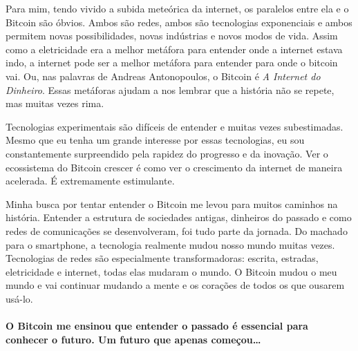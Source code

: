 Para mim, tendo vivido a subida meteórica da internet, os paralelos entre ela e o Bitcoin são óbvios. Ambos são redes, ambos são tecnologias exponenciais e ambos permitem novas possibilidades, novas indústrias e novos modos de vida. Assim como a eletricidade era a melhor metáfora para entender onde a internet estava indo, a internet pode ser a melhor metáfora para entender para onde o bitcoin vai. Ou, nas palavras de Andreas Antonopoulos, o Bitcoin é \textit{A Internet do Dinheiro}. Essas metáforas ajudam a nos lembrar que a história não se repete, mas muitas vezes rima.

Tecnologias experimentais são difíceis de entender e muitas vezes subestimadas. Mesmo que eu tenha um grande interesse por essas tecnologias, eu sou constantemente surpreendido pela rapidez do progresso e da inovação. Ver o ecossistema do Bitcoin crescer é como ver o crescimento da internet de maneira acelerada. É extremamente estimulante.

Minha busca por tentar entender o Bitcoin me levou para muitos caminhos na história. Entender a estrutura de sociedades antigas, dinheiros do passado e como redes de comunicações se desenvolveram, foi tudo parte da jornada. Do machado para o smartphone, a tecnologia realmente mudou nosso mundo muitas vezes. Tecnologias de redes são especialmente transformadoras: escrita, estradas, eletricidade e internet, todas elas mudaram o mundo. O Bitcoin mudou o meu mundo e vai continuar mudando a mente e os corações de todos os que ousarem usá-lo.

\paragraph{O Bitcoin me ensinou que entender o passado é essencial para conhecer o futuro. Um futuro que apenas começou\ldots}

